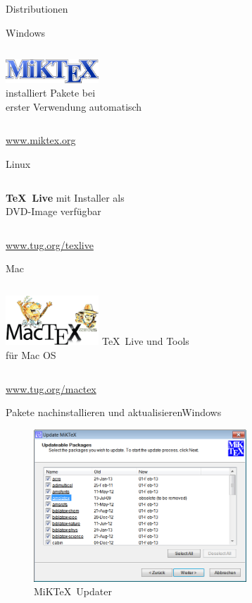 \begin{Frame}[t]{Distributionen}
  \begin{Block}{Windows}
    \begin{columns}
      \column{1mm}
      \column{5cm}
      \vskip2pt\par
      \includegraphics[width=3.5cm]{images/miktex}\\
      \column{5cm}
      installiert Pakete bei\\ erster Verwendung automatisch
    \end{columns}
    \url{www.miktex.org}
  \end{Block}

  \begin{Block}{Linux}
    \begin{columns}
      \column{1mm}
      \column{5cm}
      \vskip4pt\par
      \textcolor{texlive}{\Huge\bfseries\TeX\ Live}
      \column{5cm}
      mit Installer als\\ DVD-Image verfügbar
    \end{columns}
    \vskip4pt\par
    \url{www.tug.org/texlive}
  \end{Block}

  \begin{Block}{Mac}
    \begin{columns}
      \column{1mm}
      \column{4.5cm}
      \includegraphics[width=3.5cm]{images/mactex}
      \column{5cm}
      \TeX\ Live und Tools\\ für Mac OS
    \end{columns}
    \url{www.tug.org/mactex}
  \end{Block}
\end{Frame}

\begin{Frame}{Pakete nachinstallieren und aktualisieren}{Windows}
  \begin{figure}
    \centering
    \includegraphics[width=8cm]{images/miktex-update}
    \caption{MiK\TeX\ Updater}
  \end{figure}
\end{Frame}


